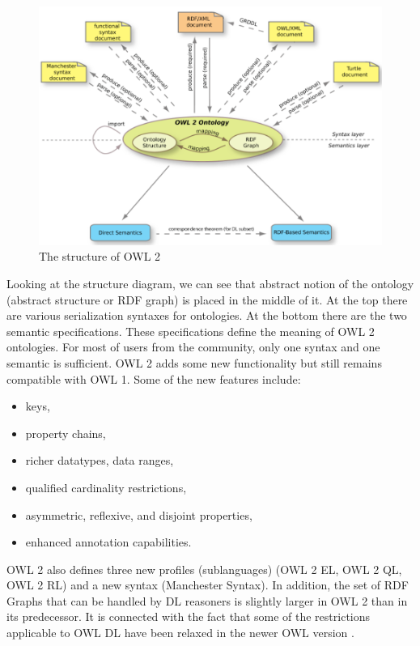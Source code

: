\medskip

\begin{figure}[htp]
\centering
\includegraphics[scale=0.5]{images/chapter2/OWL2Structure}
\caption{The structure of OWL 2 \cite{W3COWL}}
\label{fig:owl2Structure}
\end{figure}

\newpage

\noindent Looking at the structure diagram, we can see that abstract notion of the ontology (abstract structure or RDF graph) is placed in the middle of it. At the top there are various serialization syntaxes for ontologies. At the bottom there are the two semantic specifications. These specifications define the meaning of OWL 2 ontologies. For most of users from the community, only one syntax and one semantic is sufficient. OWL 2 adds some new functionality but still remains compatible with OWL 1. Some of the new features include:
\begin{itemize}
    \setlength{\itemsep}{0cm}
    \setlength{\parskip}{0cm}

    \item keys,
    \item property chains,
    \item richer datatypes, data ranges,
    \item qualified cardinality restrictions,
    \item asymmetric, reflexive, and disjoint properties,
    \item enhanced annotation capabilities.
\end{itemize}

\noindent OWL 2 also defines three new profiles (sublanguages) (OWL 2 EL, OWL 2 QL, OWL 2 RL) and a new syntax (Manchester Syntax). In addition, the set of RDF Graphs that can be handled by DL reasoners is slightly larger in OWL 2 than in its predecessor. It is connected with the fact that some of the restrictions applicable to OWL DL have been relaxed in the newer OWL version \cite{W3COWL}.
